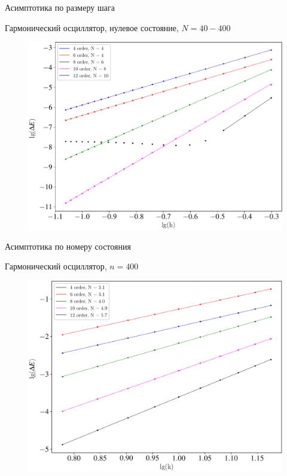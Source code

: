 \documentclass[10pt,pdf,hyperref={unicode},xcolor=dvipsnames]{beamer}
\begin{document}
\begin{frame}{Асимптотика по размеру шага}
    \vspace*{-0.5cm}
    \begin{block}{Гармонический осциллятор, нулевое состояние, $N=40-400$}
        \begin{figure}[H]
            \includegraphics[width=0.8\linewidth]{./pictures/diff_h-crop.pdf}
        \end{figure}
    \end{block}
\end{frame}

\begin{frame}{Асимптотика по номеру состояния}
    \vspace*{-0.5cm}
    \begin{block}{Гармонический осциллятор, $n = 400$}
        \begin{figure}[H]
            \includegraphics[width=0.8\linewidth]{./pictures/diff_k-crop.pdf}
        \end{figure}
    \end{block}
\end{frame}
\end{document}
